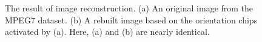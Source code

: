 \documentclass[journal]{IEEEtran}
\begin{document}
\begin{figure}[!t]
\centering
{}
\hfil
{}
\caption{The result of image reconstruction. (a) An original image from the MPEG7 dataset. (b) A rebuilt image based on the orientation chips activated by (a). Here, (a) and (b) are nearly identical.}
\label{fig:7}
\end{figure}



%
\end{document}
